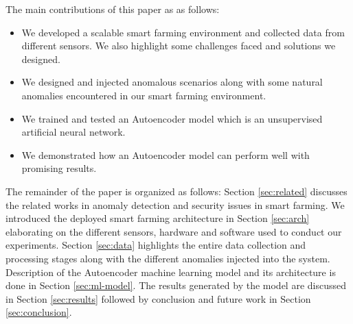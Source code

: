 The main contributions of this paper as as follows:
\begin{itemize}
    \item We developed a scalable smart farming environment and collected data from different sensors. We also highlight some challenges faced and solutions we designed.
    \item We designed and injected anomalous scenarios along with some natural anomalies encountered in our smart farming environment.  
    \item We trained and tested an Autoencoder model which is an unsupervised artificial neural network.
    \item We demonstrated how an Autoencoder model can perform well with promising results.  
\end{itemize}

The remainder of the paper is organized as follows: Section \ref{sec:related}  discusses the related works in anomaly detection and security issues in smart farming. We introduced the deployed smart farming architecture in Section \ref{sec:arch} elaborating on the different sensors, hardware and software used to conduct our experiments. Section \ref{sec:data} highlights the entire data collection and processing stages along with the different anomalies injected into the system. Description of the Autoencoder machine learning model and its architecture is done in Section \ref{sec:ml-model}. The results generated by the model are discussed in Section \ref{sec:results} followed by conclusion and future work in Section \ref{sec:conclusion}. 

